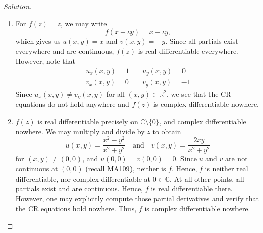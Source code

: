 \documentclass[11pt]{article}
\theoremstyle{definition}
\newenvironment{soln}{\begin{proof}[Solution]}{\end{proof}}
\begin{document}
\begin{enumerate}[leftmargin=*]
\begin{soln}
\begin{enumerate}
        \item For $f(z) = \overline{z}$, we may write
        \[
            f(x+\iota y) = x - \iota y,
        \]
        which gives us $u(x,y) = x$ and $v(x,y) = -y$. Since all partials exist everywhere and are continuous, $f(z)$ is real differentiable everywhere. However, note that
        \begin{align*}
            u_x(x,y) = 1 &\quad u_y(x,y) = 0 \\
            v_x(x,y) = 0 &\quad v_y(x,y) = -1
        \end{align*}
        Since $u_x(x,y) \neq v_y(x,y)$ for all $(x,y) \in \mathbb{R}^2$, we see that the CR equations do not hold anywhere and $f(z)$ is complex differentiable nowhere.
        
        \item $f(z)$ is real differentiable precisely on $\mathbb{C} \setminus \{ 0\}$, and complex differentiable nowhere. We may multiply and divide by $\overline{z}$ to obtain
        \[
            u(x,y) = \frac{x^2-y^2}{x^2+y^2} \quad \text{and} \quad v(x,y) = \frac{2xy}{x^2+y^2}
        \]
        for $(x,y) \neq (0,0)$, and $u(0,0) = v(0,0) = 0$. Since $u$ and $v$ are not continuous at $(0,0)$ (recall MA109), neither is $f$. Hence, $f$ is neither real differentiable, nor complex differentiable at $0 \in \mathbb{C}$. At all other points, all partials exist and are continuous. Hence, $f$ is real differentiable there. However, one may explicitly compute those partial derivatives and verify that the CR equations hold nowhere. Thus, $f$ is complex differentiable nowhere.
        
    \end{enumerate}
\end{soln}
\end{enumerate}
\end{document}
